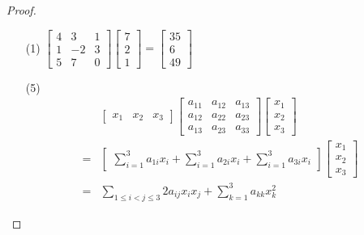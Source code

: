 \documentclass{ctexart}
\begin{document}
\begin{proof}
    \begin{enumerate}
        \item[(1)] \(\begin{bmatrix}
                4 & 3 & 1 \\1&-2&3\\5&7&0
            \end{bmatrix}\begin{bmatrix}
                7 \\2\\1
            \end{bmatrix}=\begin{bmatrix}
                35 \\6\\49
            \end{bmatrix}\)
        \item[(5)]
            \begin{align*}
                  & \begin{bmatrix}
                    x_1 & x_2 & x_3
                \end{bmatrix}
                \begin{bmatrix}
                    a_{11} & a_{12} & a_{13} \\
                    a_{12} & a_{22} & a_{23} \\
                    a_{13} & a_{23} & a_{33}
                \end{bmatrix}
                \begin{bmatrix}
                    x_1 \\x_2\\x_3
                \end{bmatrix}                                                 \\
                = & \begin{bmatrix}\sum_{i=1}^3a_{1i}x_i+\sum_{i=1}^3a_{2i}x_i+\sum_{i=1}^3a_{3i}x_i\end{bmatrix}
                \begin{bmatrix}x_1 \\x_2 \\x_3\end{bmatrix}                                                 \\
                = & \sum_{1 \leq i<j \leq 3} 2 a_{i j} x_i x_j+\sum_{k=1}^3 a_{k k} x_k^2
            \end{align*}

    \end{enumerate}
\end{proof}
\end{document}
